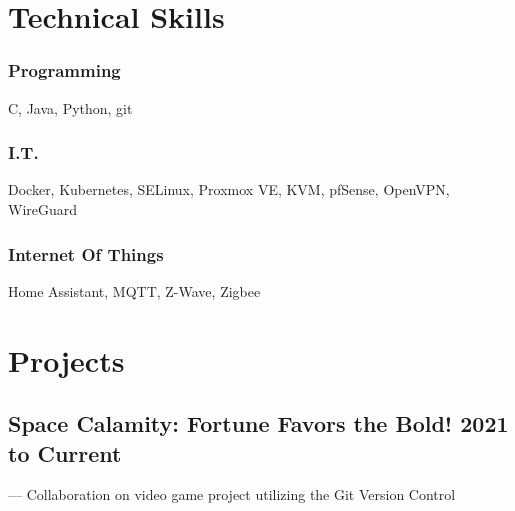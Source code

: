 \documentclass{article}
\begin{document}

\section{Technical Skills}


\subsubsection{Programming}
C, Java, Python, git 


\subsubsection{I.T.}
Docker, Kubernetes, SELinux, Proxmox VE, KVM, pfSense, OpenVPN, WireGuard

\subsubsection{Internet Of Things}
Home Assistant, MQTT, Z-Wave, Zigbee


\section{Projects}
\subsection{Space Calamity: Fortune Favors the Bold! \hfill \normalfont \normalsize 2021 to Current}
--- Collaboration on video game project utilizing the Git Version Control
\end{document}
